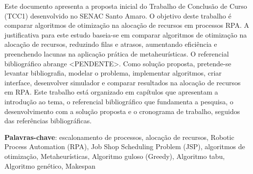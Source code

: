 \documentclass[
    12pt,                %
    openright,           %
    oneside,             %
    a4paper,             %
    english,             %
    brazil               %
]{abntex2}
\begin{document}

\frenchspacing

\pretextual

\imprimircapa

\imprimirfolhaderosto

\begin{resumo}
Este documento apresenta a proposta inicial do Trabalho de Conclusão de Curso (TCC1) desenvolvido no SENAC Santo Amaro. O objetivo deste trabalho é comparar algoritmos de otimização na alocação de recursos em processos RPA. A justificativa para este estudo baseia-se em comparar algoritmos de otimização na alocação de recursos, reduzindo filas e atrasos, aumentando eficiência e preenchendo lacunas na aplicação prática de metaheurísticas. O referencial bibliográfico abrange <PENDENTE>. Como solução proposta, pretende-se levantar bibliografia, modelar o problema, implementar algoritmos, criar interface, desenvolver simulador e comparar resultados na alocação de recursos em RPA. Este trabalho está organizado em capítulos que apresentam a introdução ao tema, o referencial bibliográfico que fundamenta a pesquisa, o desenvolvimento com a solução proposta e o cronograma de trabalho, seguidos das referências bibliográficas.

\vspace{\onelineskip}

\noindent
\textbf{Palavras-chave}: escalonamento de processos, alocação de recursos, Robotic Process Automation (RPA),  Job Shop Scheduling Problem (JSP), algoritmos de otimização, Metaheurísticas, Algoritmo guloso (Greedy), Algoritmo tabu, Algoritmo genético, Makespan
\end{resumo}

\listoffigures*
\cleardoublepage
\end{document}

